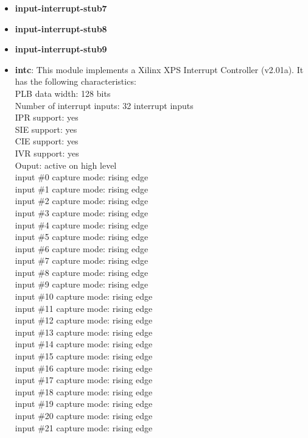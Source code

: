\begin{itemize}
\item \textbf{input-interrupt-stub7}
\item \textbf{input-interrupt-stub8}
\item \textbf{input-interrupt-stub9}
\item \textbf{intc}: This module implements a Xilinx XPS Interrupt Controller (v2.01a). It has the following characteristics:\\
PLB data width: 128 bits\\
Number of interrupt inputs: 32 interrupt inputs\\
IPR support: yes\\
SIE support: yes\\
CIE support: yes\\
IVR support: yes\\
Ouput: active on high level\\
input \#0 capture mode: rising edge\\
input \#1 capture mode: rising edge\\
input \#2 capture mode: rising edge\\
input \#3 capture mode: rising edge\\
input \#4 capture mode: rising edge\\
input \#5 capture mode: rising edge\\
input \#6 capture mode: rising edge\\
input \#7 capture mode: rising edge\\
input \#8 capture mode: rising edge\\
input \#9 capture mode: rising edge\\
input \#10 capture mode: rising edge\\
input \#11 capture mode: rising edge\\
input \#12 capture mode: rising edge\\
input \#13 capture mode: rising edge\\
input \#14 capture mode: rising edge\\
input \#15 capture mode: rising edge\\
input \#16 capture mode: rising edge\\
input \#17 capture mode: rising edge\\
input \#18 capture mode: rising edge\\
input \#19 capture mode: rising edge\\
input \#20 capture mode: rising edge\\
input \#21 capture mode: rising edge\\

\end{itemize}
